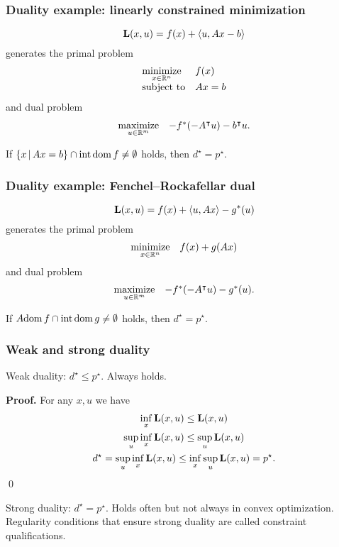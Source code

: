 \documentclass[10pt,mathserif]{beamer}
\begin{document}
\begin{frame}
\frametitle{Duality example: linearly constrained minimization}
\[
\mathbf{L}(x,u)=f(x)+\langle u, Ax-b\rangle
\]
generates the primal problem
\[
\begin{array}{ll}
\underset{x\in \mathbb{R}^n}{\mbox{minimize}}&f(x)\\
\mbox{subject to}&Ax=b
\end{array}
\]
and dual problem
\[
\begin{array}{ll}
\underset{u \in \mathbb{R}^m}{\mbox{maximize}}&-f^*(-A^\intercal u)-b^\intercal u.
\end{array}
\]

\vspace{0.2in}

If 
$\{x\,|\,Ax=b\}\cap \mathrm{int}\, \mathrm{dom}\, f\ne \emptyset$
 holds, then $d^\star=p^\star$.
\end{frame}


\begin{frame}
\frametitle{Duality example: Fenchel--Rockafellar dual}
\[
\mathbf{L}(x,u)=f(x)+\langle u, Ax\rangle-g^*(u)
\]
generates the primal problem
\[
\begin{array}{ll}
\underset{x\in \mathbb{R}^n}{\mbox{minimize}}&f(x)+g(Ax)
\end{array}
\]
and dual problem
\[
\begin{array}{ll}
\underset{u \in \mathbb{R}^m}{\mbox{maximize}}&-f^*(-A^\intercal u)-g^*(u).
\end{array}
\]
\vspace{0.2in}

If  
$A\mathrm{dom}\, f\cap \mathrm{int}\, \mathrm{dom}\, g \ne \emptyset$
 holds, then $d^\star=p^\star$.
\end{frame}



\begin{frame}
\frametitle{Weak and strong duality}
Weak duality: $d^\star\le p^\star$. Always holds.


\vspace{0.2in}
\textbf{Proof.}
For any $x,u$ we have
\begin{gather*}
\inf_x  \mathbf{L}(x,u)\le  \mathbf{L}(x,u)\\
\sup_u \inf_x  \mathbf{L}(x,u)\le \sup_u \mathbf{L}(x,u)\\
d^\star=\sup_u \inf_x  \mathbf{L}(x,u)\le \inf_x \sup_u \mathbf{L}(x,u)=p^\star.
\end{gather*}
\qed

\vspace{0.2in}

Strong duality: $d^\star=p^\star$. Holds often but not always in convex optimization.
Regularity conditions that ensure strong duality are called constraint qualifications.



\end{frame}
\end{document}
